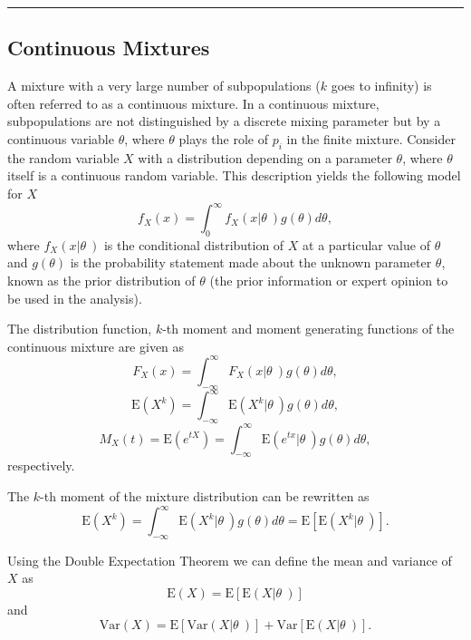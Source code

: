 \documentclass[]{book}
\theoremstyle{definition}
\theoremstyle{definition}
\theoremstyle{definition}
\theoremstyle{remark}
\begin{document}
\begin{center}\rule{0.5\linewidth}{\linethickness}\end{center}

\subsection{Continuous Mixtures}\label{continuous-mixtures}

A mixture with a very large number of subpopulations (\(k\) goes to
infinity) is often referred to as a continuous mixture. In a continuous
mixture, subpopulations are not distinguished by a discrete mixing
parameter but by a continuous variable \(\theta\), where \(\theta\)
plays the role of \(p_{i}\) in the finite mixture. Consider the random
variable \(X\) with a distribution depending on a parameter \(\theta\),
where \(\theta\) itself is a continuous random variable. This
description yields the following model for \(X\)
\[f_{X}\left( x \right) = \int_{0}^{\infty}{f_{X}\left( x\left| \theta \right.\  \right)g\left( \theta \right)} d \theta ,\]
where \(f_{X}\left( x\left| \theta \right.\  \right)\) is the
conditional distribution of \(X\) at a particular value of \(\theta\)
and \(g\left( \theta \right)\) is the probability statement made about
the unknown parameter \(\theta\), known as the prior distribution of
\(\theta\) (the prior information or expert opinion to be used in the
analysis).

The distribution function, \(k\)-th moment and moment generating
functions of the continuous mixture are given as
\[F_{X}\left( x \right) = \int_{-\infty}^{\infty}{F_{X}\left( x\left| \theta \right.\  \right)g\left( \theta \right)} d \theta,\]
\[\mathrm{E}\left( X^{k} \right) = \int_{-\infty}^{\infty}{\mathrm{E}\left( X^{k}\left| \theta \right.\  \right)g\left( \theta \right)}d \theta,\]
\[M_{X}\left( t \right) = \mathrm{E}\left( e^{t X} \right) = \int_{-\infty}^{\infty}{\mathrm{E}\left( e^{ tx}\left| \theta \right.\  \right)g\left( \theta \right)}d \theta, \]
respectively.

The \(k\)-th moment of the mixture distribution can be rewritten as
\[\mathrm{E}\left( X^{k} \right) = \int_{-\infty}^{\infty}{\mathrm{E}\left( X^{k}\left| \theta \right.\  \right)g\left( \theta \right)}d\theta = \mathrm{E}\left\lbrack \mathrm{E}\left( X^{k}\left| \theta \right.\  \right) \right\rbrack .\]

Using the Double Expectation Theorem we can define the mean and variance
of \(X\) as
\[\mathrm{E}\left( X \right) = \mathrm{E}\left\lbrack \mathrm{E}\left( X\left| \theta \right.\  \right) \right\rbrack\]
and
\[\mathrm{Var}\left( X \right) = \mathrm{E}\left\lbrack \mathrm{Var}\left( X\left| \theta \right.\  \right) \right\rbrack + \mathrm{Var}\left\lbrack \mathrm{E}\left( X\left| \theta \right.\  \right) \right\rbrack .\]
\end{document}
